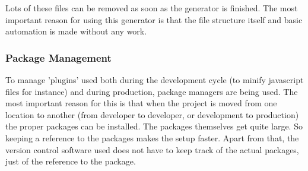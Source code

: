 Lots of these files can be removed as soon as the generator is finished. The most important reason for using this generator is that the file structure itself and basic automation is made without any work.

\subsubsection{Package Management}
To manage 'plugins' used both during the development cycle (to minify javascript files for instance) and during production, package managers are being used. The most important reason for this is that when the project is moved from one location to another (from developer to developer, or development to production) the proper packages can be installed. The packages themselves get quite large. So keeping a reference to the packages makes the setup faster. Apart from that, the version control software used does not have to keep track of the actual packages, just of the reference to the package.

